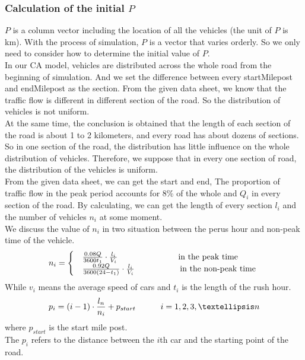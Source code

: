 \documentclass[UTF8]{mcmthesis}
\begin{document}
\subsubsection{Calculation of the initial $P$}
\indent $P$ is a column vector including the location of all the vehicles (the unit of $P$ is km). With the process of simulation, $P$ is a vector that varies orderly. So we only need to consider how to determine the initial value of $P$.\\
\indent In our CA model, vehicles are distributed across the whole road from the beginning of simulation. And we set the difference between every startMilepost and endMilepost as the section. From the given data sheet, we know that the traffic flow is different in different section of the road. So the distribution of vehicles is not uniform.\\
\indent At the same time, the conclusion is obtained that the length of each section of the road is about 1 to 2 kilometers, and every road has about dozens of sections. So in one section of the road, the distribution has little influence on the whole distribution of vehicles. Therefore, we suppose that in every one section of road, the distribution of the vehicles is uniform. \\
\indent From the given data sheet, we can get the start and end, The proportion of traffic flow in the peak period accounts for 8\% of the whole and $Q_{i}$ in every section of the road. By calculating, we can get the length of every section $l_{i}$ and the number of vehicles $n_{i}$ at some moment.\\
\indent We discuss the value of $n_{i}$ in two situation between the perus hour and non-peak time of the vehicle. 
\begin{equation}
	n_{i}=\begin{cases}
	&\frac{0.08Q}{3600t_{1}}\cdot\frac{l_{i}}{V_{i}} \indent\indent\indent \indent\quad\text{\,\,in the peak time }\\ 
	&\frac{0.92Q}{3600(24-t_{1})}\cdot\frac{l_{i}}{V_{i}}\indent\indent\indent \quad\text{in the non-peak time } 
	\end{cases}
\end{equation}
\indent While $v_{i}$ means the average speed of cars and $t_{i}$ is the length of the rush hour.\\
\begin{equation}
	p_i=(i-1)\cdot\frac{l_{n}}{n_{i}}+p_{start} \indent \indent	i=1,2,3,…n
\end{equation}
where $p_{start}$ is the start mile post.\\
\indent The $p_{i}$ refers to the distance between the $i$th car and the starting point of the road.
\end{document}
